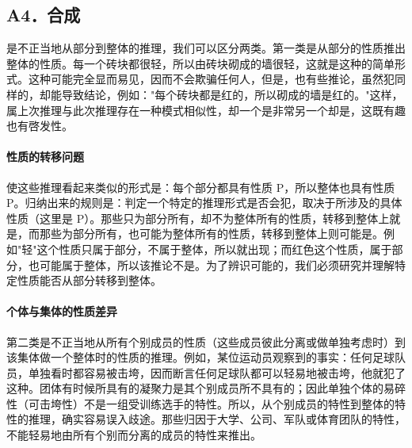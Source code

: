 \subsection{A4．合成}

\begin{theorembox}[title=合成谬误的定义]
是不正当地从部分到整体的推理，我们可以区分两类。第一类是从部分的性质推出整体的性质。每一个砖块都很轻，所以由砖块砌成的墙很轻，这就是这种的简单形式。这种可能完全显而易见，因而不会欺骗任何人，但是，也有些推论，虽然犯同样的，却能导致结论，例如："每个砖块都是红的，所以砌成的墙是红的。"这样，属上次推理与此次推理存在一种模式相似性，却一个是非常另一个却是，这既有趣也有啓发性。
\end{theorembox}

\paragraph{性质的转移问题}
\begin{examplebox}[title=性质的转移问题]
使这些推理看起来类似的形式是：每个部分都具有性质 P，所以整体也具有性质 P。归纳出来的规则是：判定一个特定的推理形式是否会犯，取决于所涉及的具体性质（这里是 P）。那些只为部分所有，却不为整体所有的性质，转移到整体上就是，而那些为部分所有，也可能为整体所有的性质，转移到整体上则可能是。例如"轻"这个性质只属于部分，不属于整体，所以就出现；而红色这个性质，属于部分，也可能属于整体，所以该推论不是。为了辨识可能的，我们必须研究并理解特定性质能否从部分转移到整体。
\end{examplebox}

\paragraph{个体与集体的性质差异}
\begin{examplebox}[title=个体与集体的性质差异]
第二类是不正当地从所有个别成员的性质（这些成员彼此分离或做单独考虑时）到该集体做一个整体时的性质的推理。例如，某位运动员观察到的事实：任何足球队员，单独看时都容易被击垮，因而断言任何足球队都可以轻易地被击垮，他就犯了这种。团体有时候所具有的凝聚力是其个别成员所不具有的；因此单独个体的易碎性（可击垮性）不是一组受训练选手的特性。所以，从个别成员的特性到整体的特性的推理，确实容易误入歧途。那些归因于大学、公司、军队或体育团队的特性，不能轻易地由所有个别而分离的成员的特性来推出。
\end{examplebox}


